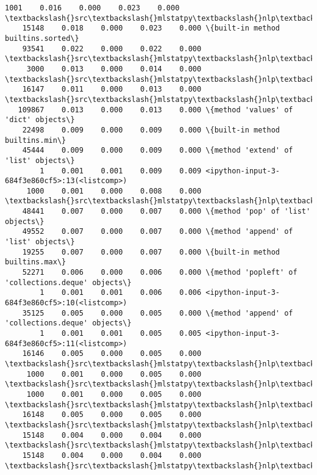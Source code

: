 \documentclass[11pt]{article}
\begin{document}
\begin{Verbatim}[commandchars=\\\{\}]
     1001    0.016    0.000    0.023    0.000 \textbackslash{}src\textbackslash{}mlstatpy\textbackslash{}nlp\textbackslash{}completion.py:132(leaves)
    15148    0.018    0.000    0.023    0.000 \{built-in method builtins.sorted\}
    93541    0.022    0.000    0.022    0.000 \textbackslash{}src\textbackslash{}mlstatpy\textbackslash{}nlp\textbackslash{}completion.py:436(<genexpr>)
     3000    0.013    0.000    0.014    0.000 \textbackslash{}src\textbackslash{}mlstatpy\textbackslash{}nlp\textbackslash{}completion.py:258(find)
    16147    0.011    0.000    0.013    0.000 \textbackslash{}src\textbackslash{}mlstatpy\textbackslash{}nlp\textbackslash{}completion.py:20(\_\_init\_\_)
   109867    0.013    0.000    0.013    0.000 \{method 'values' of 'dict' objects\}
    22498    0.009    0.000    0.009    0.000 \{built-in method builtins.min\}
    45444    0.009    0.000    0.009    0.000 \{method 'extend' of 'list' objects\}
        1    0.001    0.001    0.009    0.009 <ipython-input-3-684f3e860cf5>:13(<listcomp>)
     1000    0.001    0.000    0.008    0.000 \textbackslash{}src\textbackslash{}mlstatpy\textbackslash{}nlp\textbackslash{}completion.py:383(min\_dynamic\_keystroke2)
    48441    0.007    0.000    0.007    0.000 \{method 'pop' of 'list' objects\}
    49552    0.007    0.000    0.007    0.000 \{method 'append' of 'list' objects\}
    19255    0.007    0.000    0.007    0.000 \{built-in method builtins.max\}
    52271    0.006    0.000    0.006    0.000 \{method 'popleft' of 'collections.deque' objects\}
        1    0.001    0.001    0.006    0.006 <ipython-input-3-684f3e860cf5>:10(<listcomp>)
    35125    0.005    0.000    0.005    0.000 \{method 'append' of 'collections.deque' objects\}
        1    0.001    0.001    0.005    0.005 <ipython-input-3-684f3e860cf5>:11(<listcomp>)
    16146    0.005    0.000    0.005    0.000 \textbackslash{}src\textbackslash{}mlstatpy\textbackslash{}nlp\textbackslash{}completion.py:54(\_add)
     1000    0.001    0.000    0.005    0.000 \textbackslash{}src\textbackslash{}mlstatpy\textbackslash{}nlp\textbackslash{}completion.py:322(min\_keystroke0)
     1000    0.001    0.000    0.005    0.000 \textbackslash{}src\textbackslash{}mlstatpy\textbackslash{}nlp\textbackslash{}completion.py:353(min\_dynamic\_keystroke)
    16148    0.005    0.000    0.005    0.000 \textbackslash{}src\textbackslash{}mlstatpy\textbackslash{}nlp\textbackslash{}completion.py:518(<genexpr>)
    15148    0.004    0.000    0.004    0.000 \textbackslash{}src\textbackslash{}mlstatpy\textbackslash{}nlp\textbackslash{}completion.py:509(Fake)
    15148    0.004    0.000    0.004    0.000 \textbackslash{}src\textbackslash{}mlstatpy\textbackslash{}nlp\textbackslash{}completion.py:512(<listcomp>)

\end{Verbatim}
\end{document}
